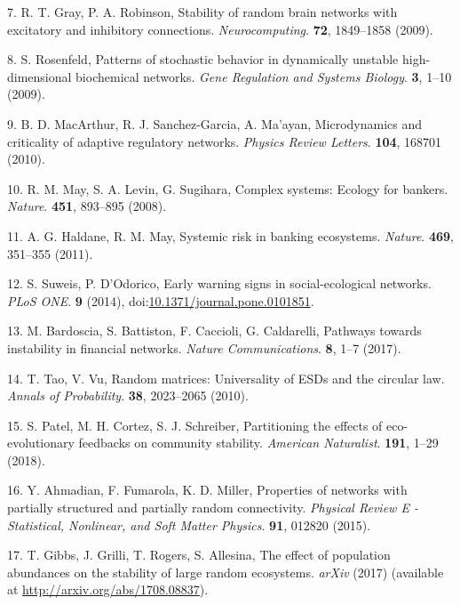 \documentclass[]{article}
\begin{document}
\hypertarget{ref-Gray2009}{}
7. R. T. Gray, P. A. Robinson, Stability of random brain networks with
excitatory and inhibitory connections. \emph{Neurocomputing}.
\textbf{72}, 1849--1858 (2009).

\hypertarget{ref-Rosenfeld2009}{}
8. S. Rosenfeld, Patterns of stochastic behavior in dynamically unstable
high-dimensional biochemical networks. \emph{Gene Regulation and Systems
Biology}. \textbf{3}, 1--10 (2009).

\hypertarget{ref-MacArthur2010}{}
9. B. D. MacArthur, R. J. Sanchez-Garcia, A. Ma'ayan, Microdynamics and
criticality of adaptive regulatory networks. \emph{Physics Review
Letters}. \textbf{104}, 168701 (2010).

\hypertarget{ref-May2008}{}
10. R. M. May, S. A. Levin, G. Sugihara, Complex systems: Ecology for
bankers. \emph{Nature}. \textbf{451}, 893--895 (2008).

\hypertarget{ref-Haldane2011}{}
11. A. G. Haldane, R. M. May, Systemic risk in banking ecosystems.
\emph{Nature}. \textbf{469}, 351--355 (2011).

\hypertarget{ref-Suweis2014}{}
12. S. Suweis, P. D'Odorico, Early warning signs in social-ecological
networks. \emph{PLoS ONE}. \textbf{9} (2014),
doi:\href{https://doi.org/10.1371/journal.pone.0101851}{10.1371/journal.pone.0101851}.

\hypertarget{ref-Bardoscia2017}{}
13. M. Bardoscia, S. Battiston, F. Caccioli, G. Caldarelli, Pathways
towards instability in financial networks. \emph{Nature Communications}.
\textbf{8}, 1--7 (2017).

\hypertarget{ref-Tao2010}{}
14. T. Tao, V. Vu, Random matrices: Universality of ESDs and the
circular law. \emph{Annals of Probability}. \textbf{38}, 2023--2065
(2010).

\hypertarget{ref-Patel2018}{}
15. S. Patel, M. H. Cortez, S. J. Schreiber, Partitioning the effects of
eco-evolutionary feedbacks on community stability. \emph{American
Naturalist}. \textbf{191}, 1--29 (2018).

\hypertarget{ref-Ahmadian2015}{}
16. Y. Ahmadian, F. Fumarola, K. D. Miller, Properties of networks with
partially structured and partially random connectivity. \emph{Physical
Review E - Statistical, Nonlinear, and Soft Matter Physics}.
\textbf{91}, 012820 (2015).

\hypertarget{ref-Gibbs2017}{}
17. T. Gibbs, J. Grilli, T. Rogers, S. Allesina, The effect of
population abundances on the stability of large random ecosystems.
\emph{arXiv} (2017) (available at
\url{http://arxiv.org/abs/1708.08837}).
\end{document}
